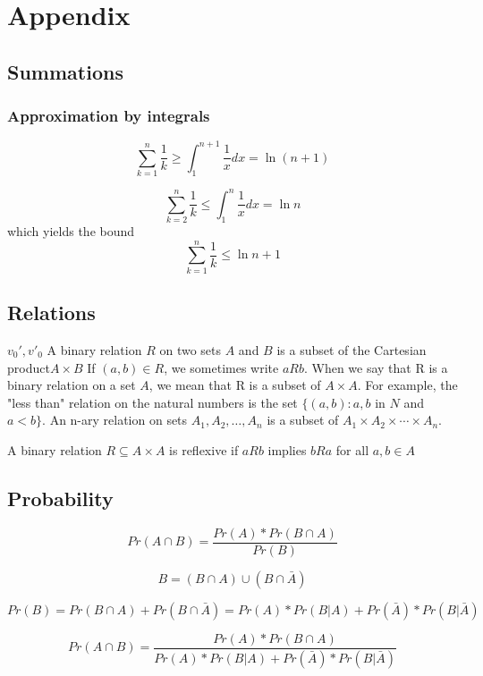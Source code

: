\documentclass{article}
\begin{document}
\section{Appendix}
\subsection{Summations}
\subsubsection{Approximation by integrals}
$$
\sum_{k=1}^n \frac{ 1}{k} \geq \int_1^{n+1}\frac{1}{x}dx = \ln(n+1)
$$

$$
\sum_{k=2}^n \frac{ 1}{k} \leq \int_1^{n}\frac{1}{x}dx = \ln n
$$
which yields the bound
$$
\sum_{k=1}^n \frac{ 1}{k} \leq \ln n + 1
$$

\subsection{Relations}
$v_0',v'_0$
A binary relation $R$ on two sets $A$ and $B$ is a subset of the Cartesian product$A \times B$
If $(a, b) \in R$, we sometimes write $a R b$. When we say that R is a binary relation on a set $A$, we mean that R is a subset of $A \times A$. For example, the "less than" relation on the natural numbers is the set $\{(a, b) : a, b$ in $N$ and $a < b\}$. An n-ary relation on sets $A_1, A_2,\ldots, A_n$ is a subset of $A_1 \times A_2 \times \cdots \times  A_n$.

A binary relation $R \subseteq A \times A$ is reflexive if 
$a R b$ implies $b R a$ for all $a,b \in A$
\subsection{Probability}
$$
Pr(A\cap B)=\frac{Pr(A)*Pr(B \cap A)}{Pr(B)}
$$

$$
B=(B \cap A)\cup (B \cap \bar{A})
$$

$$
Pr(B)=Pr(B \cap A)+Pr(B \cap \bar{A})
=Pr(A)*Pr(B|A)+Pr(\bar{A})*Pr(B|\bar{A})
$$

$$
Pr(A\cap B)=\frac{Pr(A)*Pr(B \cap A)}{Pr(A)*Pr(B|A)+Pr(\bar{A})*Pr(B|\bar{A})}
$$
\end{document}
